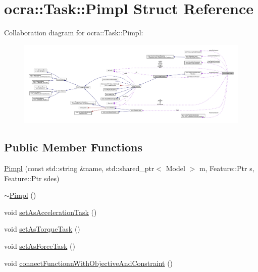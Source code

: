 \hypertarget{structocra_1_1Task_1_1Pimpl}{}\section{ocra\+:\+:Task\+:\+:Pimpl Struct Reference}
\label{structocra_1_1Task_1_1Pimpl}


Collaboration diagram for ocra\+:\+:Task\+:\+:Pimpl\+:\nopagebreak
\begin{figure}[H]
\begin{center}
\leavevmode
\includegraphics[width=350pt]{df/da6/structocra_1_1Task_1_1Pimpl__coll__graph}
\end{center}
\end{figure}
\subsection*{Public Member Functions}
\begin{DoxyCompactItemize}
\item 
\hyperlink{structocra_1_1Task_1_1Pimpl_a3d7faa7e6fa107d07e079823df57b07e}{Pimpl} (const std\+::string \&name, std\+::shared\+\_\+ptr$<$ Model $>$ m, Feature\+::\+Ptr s, Feature\+::\+Ptr sdes)
\item 
\hyperlink{structocra_1_1Task_1_1Pimpl_ae00df5386f25d40f820ef4bc1296ea4a}{$\sim$\+Pimpl} ()
\item 
void \hyperlink{structocra_1_1Task_1_1Pimpl_a1b06484c1ce60c68a20df0369bdb8221}{set\+As\+Acceleration\+Task} ()
\item 
void \hyperlink{structocra_1_1Task_1_1Pimpl_ab5bfb5126aa62de5e77c49c65711f0c2}{set\+As\+Torque\+Task} ()
\item 
void \hyperlink{structocra_1_1Task_1_1Pimpl_a6591dc9a28cc7cc30473559600bf5cb6}{set\+As\+Force\+Task} ()
\item 
void \hyperlink{structocra_1_1Task_1_1Pimpl_aabf390e84dff086a53ea876fad5755c5}{connect\+Functionn\+With\+Objective\+And\+Constraint} ()
\end{DoxyCompactItemize}
